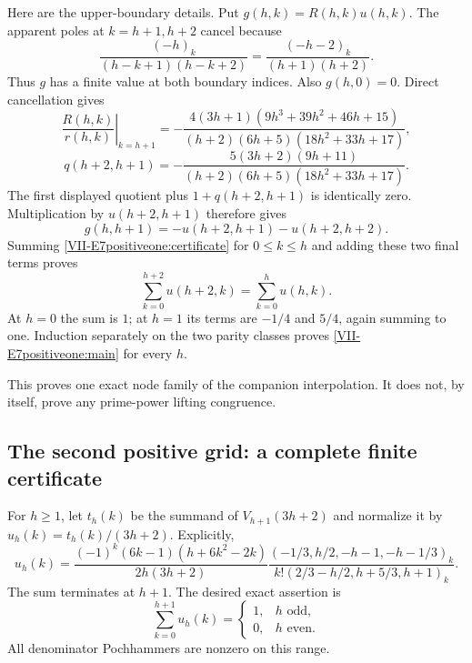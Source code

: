 \documentclass[11pt,letterpaper]{article}
\numberwithin{equation}{section}
\begin{document}
Here are the upper-boundary details. Put $g(h,k)=R(h,k)u(h,k)$.
The apparent poles at $k=h+1,h+2$ cancel because
\[
 \frac{(-h)_k}{(h-k+1)(h-k+2)}
 =\frac{(-h-2)_k}{(h+1)(h+2)}.
\]
Thus $g$ has a finite value at both boundary indices. Also
$g(h,0)=0$. Direct cancellation gives
\[
 \left.\frac{R(h,k)}{r(h,k)}\right|_{k=h+1}
 =-\frac{4(3h+1)(9h^3+39h^2+46h+15)}
 {(h+2)(6h+5)(18h^2+33h+17)},
\]
\[
 q(h+2,h+1)=
 -\frac{5(3h+2)(9h+11)}
 {(h+2)(6h+5)(18h^2+33h+17)}.
\]
The first displayed quotient plus $1+q(h+2,h+1)$ is identically
zero. Multiplication by $u(h+2,h+1)$ therefore gives
\[
 g(h,h+1)=-u(h+2,h+1)-u(h+2,h+2).
\]
Summing \eqref{VII-E7positiveone:certificate} for $0\le k\le h$
and adding these two final terms proves
\[
 \sum_{k=0}^{h+2}u(h+2,k)=\sum_{k=0}^hu(h,k).
\]
At $h=0$ the sum is $1$; at $h=1$ its terms are $-1/4$ and
$5/4$, again summing to one. Induction separately on the two
parity classes proves \eqref{VII-E7positiveone:main} for every $h$.

This proves one exact node family of the companion interpolation.
It does not, by itself, prove any prime-power lifting congruence.


\subsection{The second positive grid: a complete finite certificate}
For $h\ge1$, let $t_h(k)$ be the summand of $V_{h+1}(3h+2)$
and normalize it by $u_h(k)=t_h(k)/(3h+2)$. Explicitly,
\[
 u_h(k)=\frac{(-1)^k(6k-1)(h+6k^2-2k)}{2h(3h+2)}
 \frac{(-1/3,h/2,-h-1,-h-1/3)_k}
 {k!(2/3-h/2,h+5/3,h+1)_k}.
\]
The sum terminates at $h+1$. The desired exact assertion is
\[
 \sum_{k=0}^{h+1}u_h(k)=
 \begin{cases}1,&h\text{ odd},\\0,&h\text{ even}.\end{cases}
\]
All denominator Pochhammers are nonzero on this range.
\end{document}
